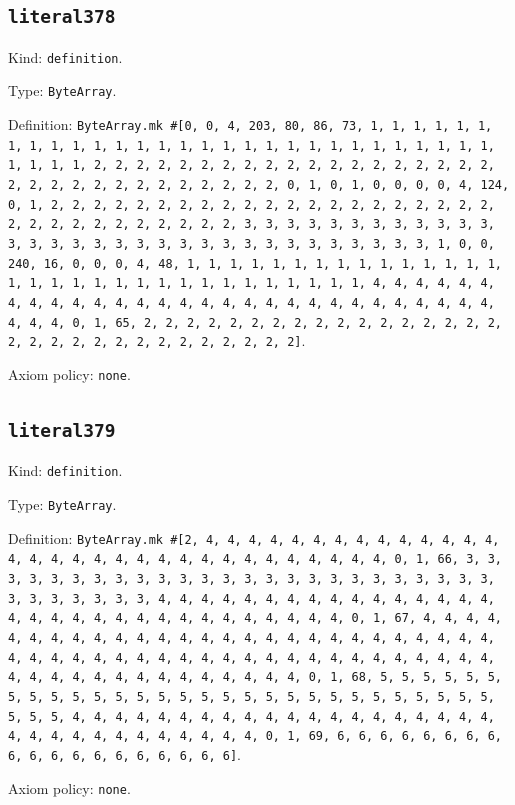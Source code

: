 \documentclass[11pt]{article}
\begin{document}
\subsection*{\texttt{literal378}}
\noindent Kind: \texttt{definition}.\par
\noindent Type: \texttt{ByteArray}.\par
\noindent Definition: \texttt{ByteArray.mk \#[0, 0, 4, 203, 80, 86, 73, 1, 1, 1, 1, 1, 1, 1, 1, 1, 1, 1, 1, 1, 1, 1, 1, 1, 1, 1, 1, 1, 1, 1, 1, 1, 1, 1, 1, 1, 1, 1, 1, 1, 2, 2, 2, 2, 2, 2, 2, 2, 2, 2, 2, 2, 2, 2, 2, 2, 2, 2, 2, 2, 2, 2, 2, 2, 2, 2, 2, 2, 2, 2, 2, 2, 0, 1, 0, 1, 0, 0, 0, 0, 4, 124, 0, 1, 2, 2, 2, 2, 2, 2, 2, 2, 2, 2, 2, 2, 2, 2, 2, 2, 2, 2, 2, 2, 2, 2, 2, 2, 2, 2, 2, 2, 2, 2, 2, 2, 3, 3, 3, 3, 3, 3, 3, 3, 3, 3, 3, 3, 3, 3, 3, 3, 3, 3, 3, 3, 3, 3, 3, 3, 3, 3, 3, 3, 3, 3, 3, 3, 1, 0, 0, 240, 16, 0, 0, 0, 4, 48, 1, 1, 1, 1, 1, 1, 1, 1, 1, 1, 1, 1, 1, 1, 1, 1, 1, 1, 1, 1, 1, 1, 1, 1, 1, 1, 1, 1, 1, 1, 1, 1, 4, 4, 4, 4, 4, 4, 4, 4, 4, 4, 4, 4, 4, 4, 4, 4, 4, 4, 4, 4, 4, 4, 4, 4, 4, 4, 4, 4, 4, 4, 4, 4, 0, 1, 65, 2, 2, 2, 2, 2, 2, 2, 2, 2, 2, 2, 2, 2, 2, 2, 2, 2, 2, 2, 2, 2, 2, 2, 2, 2, 2, 2, 2, 2, 2, 2]}.\par
\noindent Axiom policy: \texttt{none}.\par
\subsection*{\texttt{literal379}}
\noindent Kind: \texttt{definition}.\par
\noindent Type: \texttt{ByteArray}.\par
\noindent Definition: \texttt{ByteArray.mk \#[2, 4, 4, 4, 4, 4, 4, 4, 4, 4, 4, 4, 4, 4, 4, 4, 4, 4, 4, 4, 4, 4, 4, 4, 4, 4, 4, 4, 4, 4, 4, 4, 4, 0, 1, 66, 3, 3, 3, 3, 3, 3, 3, 3, 3, 3, 3, 3, 3, 3, 3, 3, 3, 3, 3, 3, 3, 3, 3, 3, 3, 3, 3, 3, 3, 3, 3, 3, 4, 4, 4, 4, 4, 4, 4, 4, 4, 4, 4, 4, 4, 4, 4, 4, 4, 4, 4, 4, 4, 4, 4, 4, 4, 4, 4, 4, 4, 4, 4, 4, 0, 1, 67, 4, 4, 4, 4, 4, 4, 4, 4, 4, 4, 4, 4, 4, 4, 4, 4, 4, 4, 4, 4, 4, 4, 4, 4, 4, 4, 4, 4, 4, 4, 4, 4, 4, 4, 4, 4, 4, 4, 4, 4, 4, 4, 4, 4, 4, 4, 4, 4, 4, 4, 4, 4, 4, 4, 4, 4, 4, 4, 4, 4, 4, 4, 4, 4, 0, 1, 68, 5, 5, 5, 5, 5, 5, 5, 5, 5, 5, 5, 5, 5, 5, 5, 5, 5, 5, 5, 5, 5, 5, 5, 5, 5, 5, 5, 5, 5, 5, 5, 5, 4, 4, 4, 4, 4, 4, 4, 4, 4, 4, 4, 4, 4, 4, 4, 4, 4, 4, 4, 4, 4, 4, 4, 4, 4, 4, 4, 4, 4, 4, 4, 4, 0, 1, 69, 6, 6, 6, 6, 6, 6, 6, 6, 6, 6, 6, 6, 6, 6, 6, 6, 6, 6, 6]}.\par
\noindent Axiom policy: \texttt{none}.\par
\end{document}
